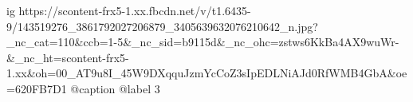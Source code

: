  
 
 
 
 

\ifcmt
  ig https://scontent-frx5-1.xx.fbcdn.net/v/t1.6435-9/143519276_3861792027206879_3405639632076210642_n.jpg?_nc_cat=110&ccb=1-5&_nc_sid=b9115d&_nc_ohc=zstws6KkBa4AX9wuWr-&_nc_ht=scontent-frx5-1.xx&oh=00_AT9u8I_45W9DXqquJzmYcCoZ3sIpEDLNiAJd0RfWMB4GbA&oe=620FB7D1
  @caption @label 3
\fi
